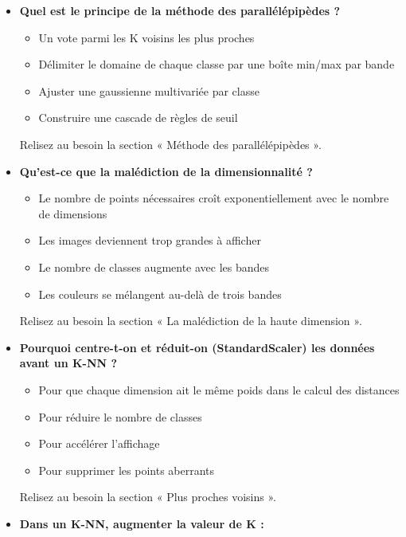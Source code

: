 \documentclass[
  french,
  11pt,
  letterpaper,
  open=any,
  twoside=false,
  french]{scrbook}
\providecommand{\tightlist}{%
  \setlength{\itemsep}{0pt}\setlength{\parskip}{0pt}}
\begin{document}
\begin{itemize}
  Relisez au besoin la section « Mesures de performance ».
\item
  \textbf{Quel est le principe de la méthode des parallélépipèdes ?}

  \begin{itemize}
  \tightlist
  \item
    Un vote parmi les K voisins les plus proches
  \item
    Délimiter le domaine de chaque classe par une boîte min/max par
    bande
  \item
    Ajuster une gaussienne multivariée par classe
  \item
    Construire une cascade de règles de seuil
  \end{itemize}

  Relisez au besoin la section « Méthode des parallélépipèdes ».
\item
  \textbf{Qu'est-ce que la malédiction de la dimensionnalité ?}

  \begin{itemize}
  \tightlist
  \item
    Le nombre de points nécessaires croît exponentiellement avec le
    nombre de dimensions
  \item
    Les images deviennent trop grandes à afficher
  \item
    Le nombre de classes augmente avec les bandes
  \item
    Les couleurs se mélangent au-delà de trois bandes
  \end{itemize}

  Relisez au besoin la section « La malédiction de la haute dimension ».
\item
  \textbf{Pourquoi centre-t-on et réduit-on (StandardScaler) les données
  avant un K-NN ?}

  \begin{itemize}
  \tightlist
  \item
    Pour que chaque dimension ait le même poids dans le calcul des
    distances
  \item
    Pour réduire le nombre de classes
  \item
    Pour accélérer l'affichage
  \item
    Pour supprimer les points aberrants
  \end{itemize}

  Relisez au besoin la section « Plus proches voisins ».
\item
  \textbf{Dans un K-NN, augmenter la valeur de K :}


\end{itemize}
\end{document}
